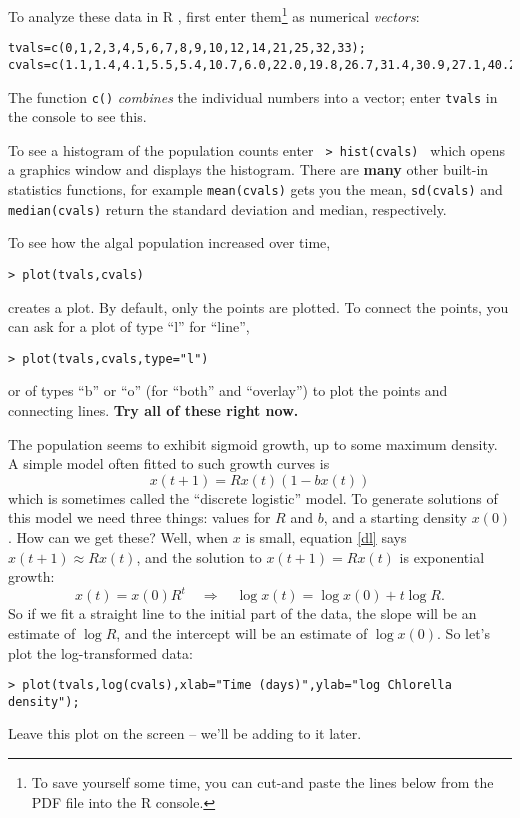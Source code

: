 \documentclass [11pt]{article}
\newcommand{\be}{\begin{equation}}
\newcommand{\ee}{\end{equation}}
\newcommand{\blst}{\vspace{-0.035in} \begin{lstlisting}}
\newcommand{\ttt}[1]{\texttt{#1}}
\numberwithin{exercise}{section}
\def\R{R }
\begin{document}
To analyze these data in \R, first enter them\footnote{To save yourself some time, you can cut-and paste
the lines below from the PDF file into the R console.}
as numerical \textit{vectors}: 
\blst
tvals=c(0,1,2,3,4,5,6,7,8,9,10,12,14,21,25,32,33); 
cvals=c(1.1,1.4,4.1,5.5,5.4,10.7,6.0,22.0,19.8,26.7,31.4,30.9,27.1,40.2,36.1,36.8,31.6);
\end{lstlisting}
The function \texttt{c()} \textit{combines} 
the individual numbers into a vector; enter \ttt{tvals} in the console to see this.  

To see a histogram of the population counts enter \verb! > hist(cvals) !
which opens a graphics window and displays the histogram. There are \textbf{many} other 
built-in statistics functions, for example \texttt{mean(cvals)} gets you 
the mean, \texttt{sd(cvals)} and \texttt{median(cvals)} return the standard deviation and median,
respectively. 

To see how the algal population increased over time,  
\blst
> plot(tvals,cvals) 
\end{lstlisting}
creates a plot. By default, only the points are plotted. To connect the points, you can
ask for a plot of type ``l'' for ``line'', 
\blst
> plot(tvals,cvals,type="l")
\end{lstlisting}
or of types ``b'' or ``o'' (for ``both'' and ``overlay'') to plot the points and connecting
lines. \textbf{Try all of these right now.} 

The population seems to exhibit sigmoid growth, up to some maximum density. A simple
model often fitted to such growth curves is 
\be
x(t+1)=R x(t) (1-b x(t))
\label{dl}
\ee
which is sometimes called the ``discrete logistic'' model. To generate solutions of
this model we need three things: values for $R$ and $b$, and a starting density $x(0)$. 
How can we get these? Well, when $x$ is small, equation \eqref{dl} says $x(t+1) \approx R x(t)$, 
and the solution to $x(t+1)=R x(t)$ is exponential growth:
\be
x(t)=x(0)R^t \quad \Rightarrow \quad \log x(t) = \log x(0) + t \log R.    
\ee
So if we fit a straight line to the initial part of the data, the slope will 
be an estimate of $\log R$, and the intercept will be an estimate
of $\log x(0)$. So let's plot the log-transformed data: 
\blst
> plot(tvals,log(cvals),xlab="Time (days)",ylab="log Chlorella density");  
\end{lstlisting}
Leave this plot on the screen -- we'll be adding to it later. 
\end{document}
